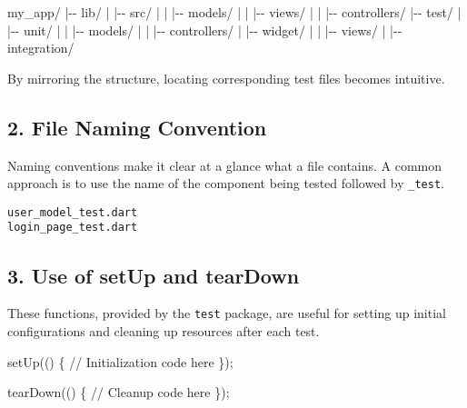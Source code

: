 \documentclass[
]{article}
\newenvironment{Shaded}{\begin{snugshade}}{\end{snugshade}}
\newcommand{\CommentTok}[1]{\textcolor[rgb]{0.48,0.49,0.49}{#1}}
\newcommand{\NormalTok}[1]{\textcolor[rgb]{0.81,0.81,0.76}{#1}}
\newcommand{\OperatorTok}[1]{\textcolor[rgb]{0.81,0.81,0.76}{#1}}
\newcommand{\VariableTok}[1]{\textcolor[rgb]{0.15,0.68,0.68}{#1}}
\begin{document}
\begin{Shaded}
\begin{Highlighting}[]
\VariableTok{my\_app}\OperatorTok{/}
\OperatorTok{|}\CommentTok{{-}{-} lib/}
\OperatorTok{|}   \OperatorTok{|}\CommentTok{{-}{-} src/}
\OperatorTok{|}   \OperatorTok{|}   \OperatorTok{|}\CommentTok{{-}{-} models/}
\OperatorTok{|}   \OperatorTok{|}   \OperatorTok{|}\CommentTok{{-}{-} views/}
\OperatorTok{|}   \OperatorTok{|}   \OperatorTok{|}\CommentTok{{-}{-} controllers/}
\OperatorTok{|}\CommentTok{{-}{-} test/}
\OperatorTok{|}   \OperatorTok{|}\CommentTok{{-}{-} unit/}
\OperatorTok{|}   \OperatorTok{|}   \OperatorTok{|}\CommentTok{{-}{-} models/}
\OperatorTok{|}   \OperatorTok{|}   \OperatorTok{|}\CommentTok{{-}{-} controllers/}
\OperatorTok{|}   \OperatorTok{|}\CommentTok{{-}{-} widget/}
\OperatorTok{|}   \OperatorTok{|}   \OperatorTok{|}\CommentTok{{-}{-} views/}
\OperatorTok{|}   \OperatorTok{|}\CommentTok{{-}{-} integration/}
\end{Highlighting}
\end{Shaded}

By mirroring the structure, locating corresponding test files becomes
intuitive.

\subsection{2. File Naming Convention}\label{file-naming-convention}

Naming conventions make it clear at a glance what a file contains. A
common approach is to use the name of the component being tested
followed by \texttt{\_test}.

\begin{verbatim}
user_model_test.dart
login_page_test.dart
\end{verbatim}

\subsection{3. Use of setUp and
tearDown}\label{use-of-setup-and-teardown}

These functions, provided by the \texttt{test} package, are useful for
setting up initial configurations and cleaning up resources after each
test.

\begin{Shaded}
\begin{Highlighting}[]
\NormalTok{setUp(() }\OperatorTok{\{}
  \CommentTok{// Initialization code here}
\OperatorTok{\}}\NormalTok{);}

\NormalTok{tearDown(() }\OperatorTok{\{}
  \CommentTok{// Cleanup code here}
\OperatorTok{\}}\NormalTok{);}
\end{Highlighting}
\end{Shaded}
\end{document}
